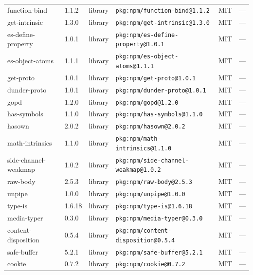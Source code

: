 \documentclass[11pt,a4paper]{article}
\begin{document}
\begin{longtable}{|p{4cm}|p{2cm}|p{1.6cm}|p{5cm}|p{1.5cm}|p{3.5cm}|}
\raggedright function-bind & 1.1.2 & library & \small\texttt{pkg:npm/function-bind@1.1.2} & MIT & \small — \\
\raggedright get-intrinsic & 1.3.0 & library & \small\texttt{pkg:npm/get-intrinsic@1.3.0} & MIT & \small — \\
\raggedright es-define-property & 1.0.1 & library & \small\texttt{pkg:npm/es-define-property@1.0.1} & MIT & \small — \\
\raggedright es-object-atoms & 1.1.1 & library & \small\texttt{pkg:npm/es-object-atoms@1.1.1} & MIT & \small — \\
\raggedright get-proto & 1.0.1 & library & \small\texttt{pkg:npm/get-proto@1.0.1} & MIT & \small — \\
\raggedright dunder-proto & 1.0.1 & library & \small\texttt{pkg:npm/dunder-proto@1.0.1} & MIT & \small — \\
\raggedright gopd & 1.2.0 & library & \small\texttt{pkg:npm/gopd@1.2.0} & MIT & \small — \\
\raggedright has-symbols & 1.1.0 & library & \small\texttt{pkg:npm/has-symbols@1.1.0} & MIT & \small — \\
\raggedright hasown & 2.0.2 & library & \small\texttt{pkg:npm/hasown@2.0.2} & MIT & \small — \\
\raggedright math-intrinsics & 1.1.0 & library & \small\texttt{pkg:npm/math-intrinsics@1.1.0} & MIT & \small — \\
\raggedright side-channel-weakmap & 1.0.2 & library & \small\texttt{pkg:npm/side-channel-weakmap@1.0.2} & MIT & \small — \\
\raggedright raw-body & 2.5.3 & library & \small\texttt{pkg:npm/raw-body@2.5.3} & MIT & \small — \\
\raggedright unpipe & 1.0.0 & library & \small\texttt{pkg:npm/unpipe@1.0.0} & MIT & \small — \\
\raggedright type-is & 1.6.18 & library & \small\texttt{pkg:npm/type-is@1.6.18} & MIT & \small — \\
\raggedright media-typer & 0.3.0 & library & \small\texttt{pkg:npm/media-typer@0.3.0} & MIT & \small — \\
\raggedright content-disposition & 0.5.4 & library & \small\texttt{pkg:npm/content-disposition@0.5.4} & MIT & \small — \\
\raggedright safe-buffer & 5.2.1 & library & \small\texttt{pkg:npm/safe-buffer@5.2.1} & MIT & \small — \\
\raggedright cookie & 0.7.2 & library & \small\texttt{pkg:npm/cookie@0.7.2} & MIT & \small — \\

\end{longtable}
\end{document}
